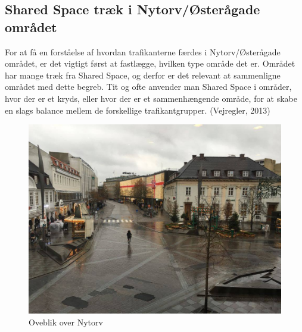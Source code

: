 \subsection{Shared Space træk i Nytorv/Østerågade området}
\label{omrade_sharedspace}
For at få en forståelse af hvordan trafikanterne færdes i Nytorv/Østerågade området, er det vigtigt først at fastlægge, hvilken type område det er. Området har mange træk fra Shared Space, og derfor er det relevant at sammenligne området med dette begreb.
Tit og ofte anvender man Shared Space i områder, hvor der er et kryds, eller hvor der er et sammenhængende område, for at skabe en slags balance mellem de forskellige trafikantgrupper. (Vejregler, 2013)

\begin{figure}[htbp]
   \centering
   \begin{adjustbox}{max width=\textwidth}
     \includegraphics[scale=0.3]{figures/Billederogfigur/Nytorvoverblik.jpg}
  \end{adjustbox}
   \caption{Oveblik over Nytorv}
   \label{fig:nytorv}
 \end{figure}

